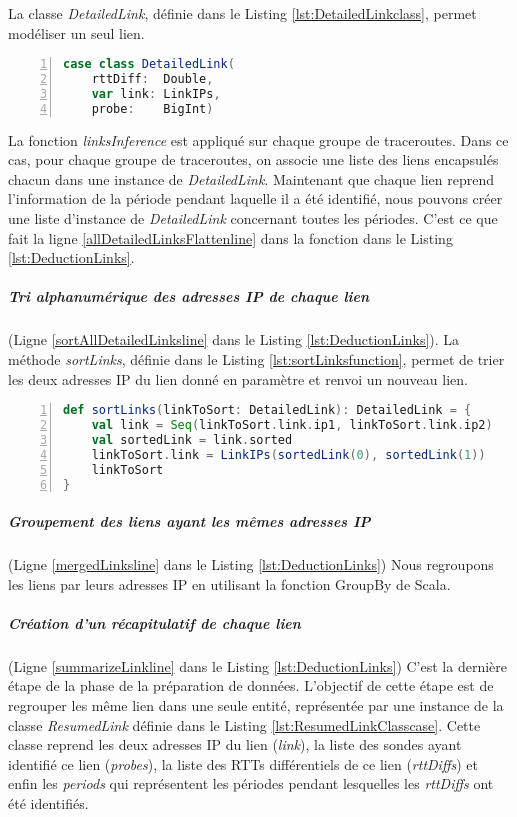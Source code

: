 La classe \textit{DetailedLink}, définie dans le Listing \ref{lst:DetailedLinkclass}, permet  modéliser un seul lien. 
\begin{lstlisting}[language=scala,firstnumber=1, caption={Définition de la classe DetailedLink},label={lst:DetailedLinkclass}, basicstyle = \footnotesize,escapechar=|,numbers=left,
stepnumber=1] 
case class DetailedLink(
	rttDiff:  Double,
	var link: LinkIPs,
	probe:    BigInt)
\end{lstlisting}

La fonction \textit{linksInference} est appliqué sur chaque groupe de traceroutes. Dans ce cas, pour chaque groupe de traceroutes, on associe une liste des liens encapsulés chacun dans une instance de \textit{DetailedLink}. Maintenant que chaque lien reprend l'information de la période pendant laquelle il a été identifié, nous pouvons créer une liste d'instance de \textit{DetailedLink} concernant toutes les périodes. C'est ce que fait la ligne \ref{allDetailedLinksFlattenline} dans la fonction dans le Listing \ref{lst:DeductionLinks}.

\subparagraph{Tri alphanumérique des adresses IP de chaque lien} (Ligne \ref{sortAllDetailedLinksline} dans le Listing \ref{lst:DeductionLinks}). La méthode \textit{sortLinks}, définie dans le Listing \ref{lst:sortLinksfunction}, permet de trier les deux adresses IP du lien donné en paramètre et renvoi un nouveau lien.
\begin{lstlisting}[language=scala,firstnumber=1, caption={Définition de la fonction sortLinks},label={lst:sortLinksfunction}, basicstyle = \footnotesize,escapechar=|,numbers=left,
stepnumber=1] 
def sortLinks(linkToSort: DetailedLink): DetailedLink = {
	val link = Seq(linkToSort.link.ip1, linkToSort.link.ip2)
	val sortedLink = link.sorted
	linkToSort.link = LinkIPs(sortedLink(0), sortedLink(1))
	linkToSort
}
\end{lstlisting}


\subparagraph{Groupement des liens ayant les mêmes adresses IP} (Ligne \ref{mergedLinksline} dans le Listing \ref{lst:DeductionLinks})
Nous regroupons les liens par leurs adresses IP en utilisant la fonction GroupBy de Scala.

\subparagraph{Création d'un récapitulatif de chaque lien} (Ligne \ref{summarizeLinkline} dans le Listing \ref{lst:DeductionLinks})
C'est la dernière étape de la phase de la préparation de données.  L'objectif de cette étape est de regrouper les même lien dans une seule entité, représentée par une instance de la classe \textit{ResumedLink} définie dans le Listing \ref{lst:ResumedLinkClasscase}.
 Cette classe reprend les deux  adresses IP du lien (\textit{link}), la liste des sondes ayant identifié ce lien (\textit{probes}), la liste des RTTs différentiels de ce lien (\textit{rttDiffs}) et enfin les \textit{periods} qui  représentent les périodes  pendant lesquelles les \textit{rttDiffs} ont été identifiés. 



